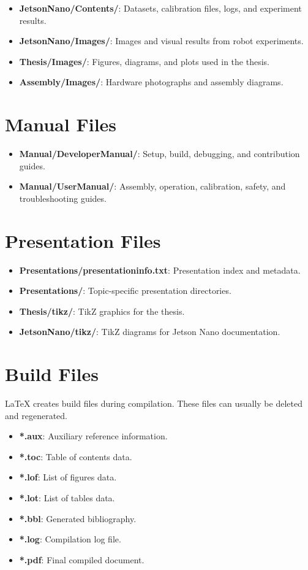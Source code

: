 \begin{itemize}
	\item \textbf{JetsonNano/Contents/}: Datasets, calibration files, logs, and experiment results.
	\item \textbf{JetsonNano/Images/}: Images and visual results from robot experiments.
	\item \textbf{Thesis/Images/}: Figures, diagrams, and plots used in the thesis.
	\item \textbf{Assembly/Images/}: Hardware photographs and assembly diagrams.
\end{itemize}

\section{Manual Files}

\begin{itemize}
	\item \textbf{Manual/DeveloperManual/}: Setup, build, debugging, and contribution guides.
	\item \textbf{Manual/UserManual/}: Assembly, operation, calibration, safety, and troubleshooting guides.
\end{itemize}

\section{Presentation Files}

\begin{itemize}
	\item \textbf{Presentations/presentationinfo.txt}: Presentation index and metadata.
	\item \textbf{Presentations/}: Topic-specific presentation directories.
	\item \textbf{Thesis/tikz/}: TikZ graphics for the thesis.
	\item \textbf{JetsonNano/tikz/}: TikZ diagrams for Jetson Nano documentation.
\end{itemize}

\section{Build Files}

\LaTeX{} creates build files during compilation. These files can usually be deleted and regenerated.

\begin{itemize}
	\item \textbf{*.aux}: Auxiliary reference information.
	\item \textbf{*.toc}: Table of contents data.
	\item \textbf{*.lof}: List of figures data.
	\item \textbf{*.lot}: List of tables data.
	\item \textbf{*.bbl}: Generated bibliography.
	\item \textbf{*.log}: Compilation log file.
	\item \textbf{*.pdf}: Final compiled document.
\end{itemize}

